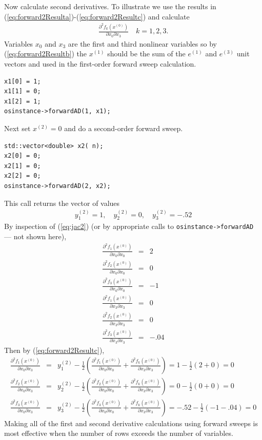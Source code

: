\documentclass[11pt]{article}
\newcommand{\DD}[3]{ \frac{\partial^2 #1}{\partial #2 \partial #3} }
\renewcommand{\_}{{\char"5F}}
\renewcommand{\{}{{\char"7B}}
\renewcommand{\}}{{\char"7D}}
\renewcommand{\^}{{\char"0D}}
\renewcommand{\'}{{\char"0D}}
\begin{document}
\begin{enumerate}[Step 1:]
Now calculate second derivatives.  To illustrate we use the results in (\ref{eq:forward2Resulta})-(\ref{eq:forward2Resultc}) and calculate
\begin{eqnarray*}
\DD{f_{k}(x^{(0)})}{x_{0}}{x_{3}} \quad k = 1, 2, 3.
\end{eqnarray*}
Variables $x_{0}$ and $x_{3}$ are the first and third nonlinear variables so by  (\ref{eq:forward2Resultb}) the $x^{(1)}$ should be the sum of the $e^{(1)}$ and $e^{(3)}$ unit vectors and used in the  first-order forward sweep calculation.
\begin{verbatim}
x1[0] = 1;
x1[1] = 0;
x1[2] = 1;
osinstance->forwardAD(1, x1);
\end{verbatim}
Next set $x^{(2)} = 0$ and do a second-order forward sweep.
\begin{verbatim}
std::vector<double> x2( n);
x2[0] = 0;
x2[1] = 0;
x2[2] = 0;
osinstance->forwardAD(2, x2);
\end{verbatim}
This call returns the vector of  values
\begin{eqnarray*}
y_{1}^{(2)}  = 1, \quad y_{2}^{(2)}  = 0, \quad y_{3}^{(2)} = -.52
\end{eqnarray*}
By inspection of (\ref{eq:jac2}) (or by appropriate calls to {\tt osinstance->forwardAD} --- not shown here),
\begin{eqnarray*}
\DD{f_{1}(x^{(0)})}{x_{0}}{x_{0}} &=& 2 \\
\DD{f_{2}(x^{(0)})}{x_{0}}{x_{0}} &=&  0\\
\DD{f_{3}(x^{(0)})}{x_{0}}{x_{0}} &=& -1 \\
\DD{f_{1}(x^{(0)})}{x_{3}}{x_{3}} &=& 0 \\
\DD{f_{2}(x^{(0)})}{x_{3}}{x_{3}} &=& 0\\
\DD{f_{3}(x^{(0)})}{x_{3}}{x_{3}} &=& -.04
\end{eqnarray*}
Then by (\ref{eq:forward2Resultc}),
\begin{eqnarray*}
\DD{f_{1}(x^{(0)})}{x_{0}}{x_{3}} &=&  y_{1}^{(2)}  -  \frac{1}{2} \left( \DD{f_{1}(x^{(0)})}{x_{0}}{x_{0}}  +  \DD{f_{k}(x^{(0)})}{x_{3}}{x_{3}}  \right) =   1 -  \frac{1}{2}(2 +  0) = 0 \\
\DD{f_{2}(x^{(0)})}{x_{0}}{x_{3}} &=&   y_{2}^{(2)}  -  \frac{1}{2} \left( \DD{f_{2}(x^{(0)})}{x_{0}}{x_{0}}  +  \DD{f_{k}(x^{(0)})}{x_{3}}{x_{3}}  \right)  = 0 -  \frac{1}{2}(0 +  0) = 0 \\
\DD{f_{3}(x^{(0)})}{x_{0}}{x_{3}} &=&  y_{3}^{(2)}  -  \frac{1}{2} \left( \DD{f_{3}(x^{(0)})}{x_{0}}{x_{0}}  +  \DD{f_{k}(x^{(0)})}{x_{3}}{x_{3}}  \right) = -.52 -  \frac{1}{2}(-1 - .04) = 0
\end{eqnarray*}
Making all of the first and second derivative calculations using forward sweeps is most effective when the number of rows exceeds the number of variables.



\end{enumerate}
\end{document}
